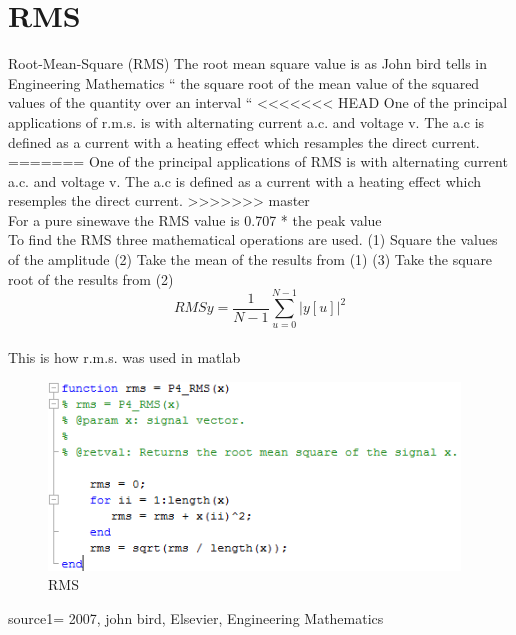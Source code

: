 \section{RMS}
Root-Mean-Square (RMS)
The root mean square value is as John bird tells in Engineering Mathematics \citep{Bird2007
} “ the square root of the mean value of the squared values of the quantity over an interval “
<<<<<<< HEAD
One of the principal applications of r.m.s. is with alternating current a.c. and voltage v. The a.c is defined as a current with a heating effect which resamples the direct current. \cite{Bird2007}
=======
One of the principal applications of RMS is with alternating current a.c. and voltage v. The a.c is defined as a current with a heating effect which resemples the direct current. \citep{Bird2007}
>>>>>>> master
\\
For a pure sinewave the RMS value is 0.707 * the peak value
\\
To find the RMS three mathematical operations are used.
(1)	Square the values of the amplitude
(2)	Take the mean of the results from (1)
(3)	Take the square root of the results from (2)
\begin{equation}\label{eq:RMS formular}
RMSy = \frac{1}{N-1}\sum_{u=0}^{N-1}|y[u]|^2
\end{equation}
\\
This is how r.m.s. was used in matlab
\begin{figure}
	\begin{center}
		\includegraphics[height=5cm]{fig/RMS_matlabCode.png}
		\caption{RMS}
	\end{center}
\end{figure}

source1= 2007, john bird, Elsevier, Engineering Mathematics